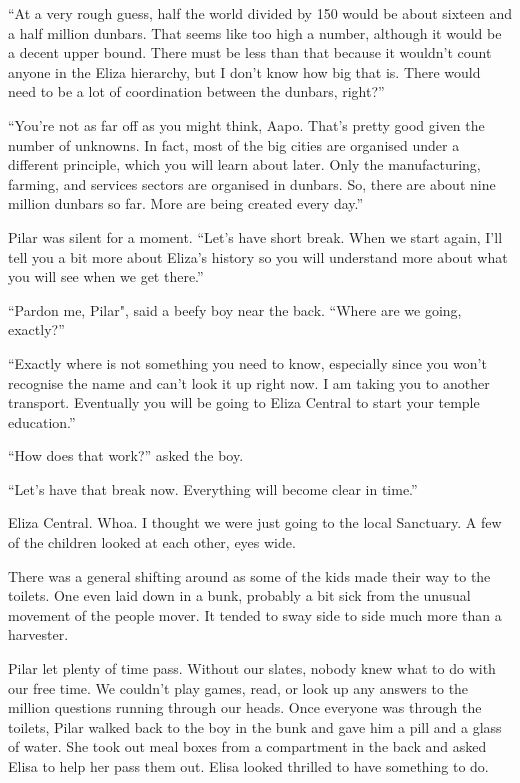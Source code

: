 ``At a very rough guess, half the world divided by 150 would be about sixteen and a half million dunbars. That seems like too high a number, although it would be a decent upper bound. There must be less than that because it wouldn't count anyone in the Eliza hierarchy, but I don't know how big that is. There would need to be a lot of coordination between the dunbars, right?''

``You're not as far off as you might think, Aapo. That's pretty good given the number of unknowns. In fact, most of the big cities are organised under a different principle, which you will learn about later. Only the manufacturing, farming, and services sectors are organised in dunbars. So, there are about nine million dunbars so far. More are being created every day.''

Pilar was silent for a moment. ``Let's have short break. When we start again, I'll tell you a bit more about Eliza's history so you will understand more about what you will see when we get there.''

``Pardon me, Pilar", said a beefy boy near the back. ``Where are we going, exactly?''

``Exactly where is not something you need to know, especially since you won't recognise the name and can't look it up right now. I am taking you to another transport. Eventually you will be going to Eliza Central to start your temple education.''

``How does that work?'' asked the boy.

``Let's have that break now. Everything will become clear in time.''

Eliza Central. Whoa. I thought we were just going to the local Sanctuary. A few of the children looked at each other, eyes wide.

There was a general shifting around as some of the kids made their way to the toilets. One even laid down in a bunk, probably a bit sick from the unusual movement of the people mover. It tended to sway side to side much more than a harvester.

Pilar let plenty of time pass. Without our slates, nobody knew what to do with our free time. We couldn't play games, read, or look up any answers to the million questions running through our heads. Once everyone was through the toilets, Pilar walked back to the boy in the bunk and gave him a pill and a glass of water. She took out meal boxes from a compartment in the back and asked Elisa to help her pass them out. Elisa looked thrilled to have something to do.

